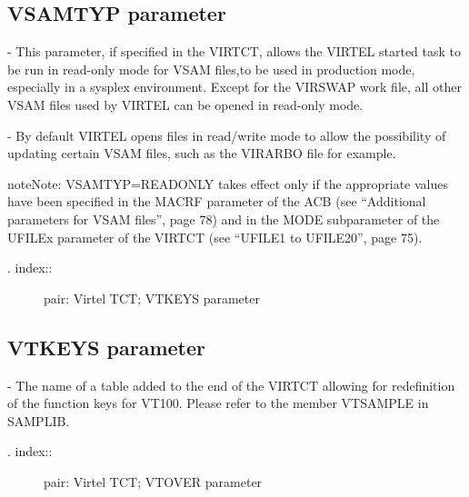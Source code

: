 \documentclass[letterpaper,10pt,english]{sphinxmanual}
\begin{document}
\subsection{VSAMTYP parameter}
\label{\detokenize{Installation_Guide:vsamtyp-parameter}}
\begin{sphinxVerbatim}[commandchars=\\\{\}]
 
\end{sphinxVerbatim}

 - This parameter, if specified in the VIRTCT, allows the VIRTEL started task to be run in read-only mode for VSAM files,to be used in production mode, especially in a sysplex environment. Except for the VIRSWAP work file, all other VSAM files used by VIRTEL can be opened in read-only mode.

 - By default VIRTEL opens files in read/write mode to allow the possibility of updating certain VSAM files, such as the VIRARBO file for example.

\begin{sphinxadmonition}{note}{Note:}
VSAMTYP=READONLY takes effect only if the appropriate values have been specified in the MACRF parameter of the ACB (see “Additional parameters for VSAM files”, page 78) and in the MODE subparameter of the UFILEx parameter of the VIRTCT (see “UFILE1 to UFILE20”, page 75).
\end{sphinxadmonition}
\begin{description}
\item[{. index::}] \leavevmode
pair: Virtel TCT; VTKEYS parameter

\end{description}


\subsection{VTKEYS parameter}
\label{\detokenize{Installation_Guide:vtkeys-parameter}}
\begin{sphinxVerbatim}[commandchars=\\\{\}]
 
\end{sphinxVerbatim}

 - The name of a table added to the end of the VIRTCT allowing for redefinition of the function keys for VT100. Please refer to the member VTSAMPLE in SAMPLIB.
\begin{description}
\item[{. index::}] \leavevmode
pair: Virtel TCT; VTOVER parameter

\end{description}
\end{document}
